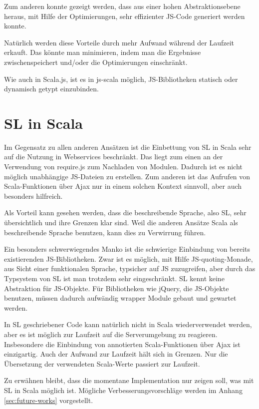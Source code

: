 \documentclass[12pt,bibtotoc]{scrreprt}
\begin{document}
Zum anderen konnte gezeigt werden, dass aus einer hohen Abstraktionsebene heraus, mit Hilfe der Optimierungen, sehr effizienter JS-Code generiert werden konnte\cite{Richard-Foy2013}.

Natürlich werden diese Vorteile durch mehr Aufwand während der Laufzeit erkauft. Das könnte man minimieren, indem man die Ergebnisse zwischenspeichert und/oder die Optimierungen einschränkt.

Wie auch in Scala.js, ist es in js-scala möglich, JS-Bibliotheken statisch oder dynamisch getypt einzubinden.

\section{SL in Scala}

Im Gegensatz zu allen anderen Ansätzen ist die Einbettung von SL in Scala sehr auf die Nutzung in Webservices beschränkt. Das liegt zum einen an der Verwendung von require.js zum Nachladen von Modulen. Dadurch ist es nicht möglich unabhängige JS-Dateien zu erstellen. Zum anderen ist das Aufrufen von Scala-Funktionen über Ajax nur in einem solchen Kontext sinnvoll, aber auch besonders hilfreich.

Als Vorteil kann gesehen werden, dass die beschreibende Sprache, also SL, sehr übersichtlich und ihre Grenzen klar sind. Weil die anderen Ansätze Scala als beschreibende Sprache benutzen, kann dies zu Verwirrung führen. 

Ein besonders schwerwiegendes Manko ist die schwierige Einbindung von bereits existierenden JS-Bibliotheken. Zwar ist es möglich, mit Hilfe JS-quoting-Monade, aus Sicht einer funktionalen Sprache, typsicher auf JS zuzugreifen, aber durch das Typsystem von SL ist man trotzdem sehr eingeschränkt. SL kennt keine Abstraktion für JS-Objekte. Für Bibliotheken wie jQuery, die JS-Objekte benutzen, müssen dadurch aufwändig wrapper Module gebaut und gewartet werden. 

In SL geschriebener Code kann natürlich nicht in Scala wiederverwendet werden, aber es ist möglich zur Laufzeit auf die Serverumgebung zu reagieren. Insbesondere die Einbindung von annotierten Scala-Funktionen über Ajax ist einzigartig. Auch der Aufwand zur Laufzeit hält sich in Grenzen. Nur die Übersetzung der verwendeten Scala-Werte passiert zur Laufzeit.

Zu erwähnen bleibt, dass die momentane Implementation nur zeigen soll, was mit SL in Scala möglich ist. Mögliche Verbesserungsvorschläge werden im Anhang \ref{sec:future-works} vorgestellt.
\end{document}
